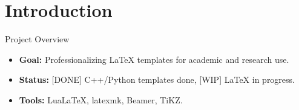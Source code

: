 \section{Introduction}

\begin{frame}{Project Overview}
    \begin{itemize}
        \item \textbf{Goal:} Professionalizing LaTeX templates for academic and research use.
        \item \textbf{Status:} [DONE] C++/Python templates done, [WIP] LaTeX in progress.
        \item \textbf{Tools:} LuaLaTeX, latexmk, Beamer, TiKZ.
    \end{itemize}
\end{frame}
